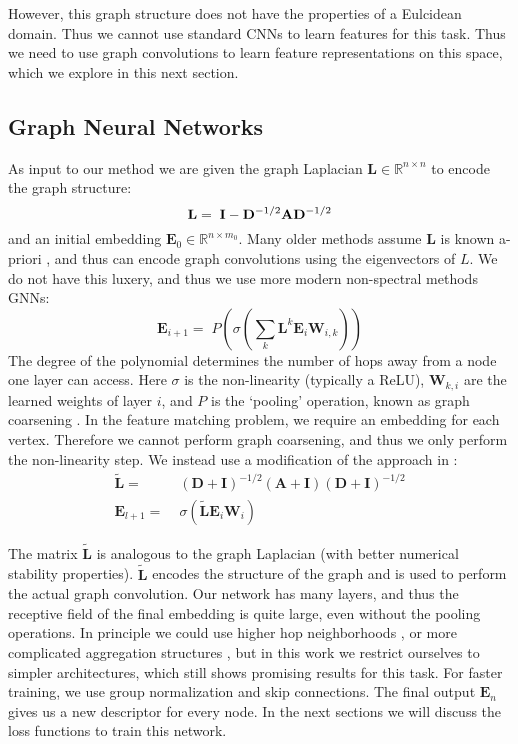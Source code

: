 \documentclass[10pt,twocolumn,letterpaper]{article}
\newcommand{\bR}{\mathbb{R}}
\newcommand{\mat}[1]{\mathbf{#1}}
\begin{document}
However, this graph structure does not have the properties of a Eulcidean domain.
Thus we cannot use standard CNNs to learn features for this task.
Thus we need to use graph convolutions to learn feature representations on this space, which we explore in this next section.

\subsection{Graph Neural Networks}
As input to our method we are given the graph Laplacian $\mat{L} \in \bR^{n \times n}$ to encode the graph structure:
\begin{equation}
  \mat{L} =\; \mat{I} - \mat{D}^{-1/2} \mat{A} \mat{D}^{-1/2} \\
\end{equation}
and an initial embedding $\mat{E}_0 \in \bR^{n \times m_0}$.
Many older methods assume $\mat{L}$ is known a-priori \cite{bruna2013spectral}, and thus can encode graph convolutions using the eigenvectors of $L$.
We do not have this luxery, and thus we use more modern non-spectral methods GNNs:
\begin{equation}
\mat{E}_{i+1} =\; P\left(\sigma\left( \sum_k \mat{L}^k \mat{E}_i \mat{W}_{i,k} \right)\right)
\end{equation}
The degree of the polynomial determines the number of hops away from a node one layer can access.
Here $\sigma$ is the non-linearity (typically a ReLU), $\mat{W}_{k,i}$ are the learned weights of layer $i$,  and $P$ is the `pooling' operation, known as graph coarsening \cite{bronstein2017geometric, gama2018mimo}.
In the feature matching problem, we require an embedding for each vertex.
Therefore we cannot perform graph coarsening, and thus we only perform the non-linearity step.
We instead use a modification of the approach in \cite{kipf2016semi}:
\begin{align}
      \widetilde{\mat{L}} =&\; (\mat{D} + \mat{I})^{-1/2} (\mat{A} + \mat{I}) (\mat{D} + \mat{I})^{-1/2} \\
\mat{E}_{l+1} =&\; \sigma\left(\widetilde{\mat{L}} \mat{E}_i \mat{W}_i \right)  \label{eq:graph_conv}
\end{align}

The matrix $\widetilde{\mat{L}}$ is analogous to the graph Laplacian (with better numerical stability properties).
$\widetilde{\mat{L}}$ encodes the structure of the graph and is used to perform the actual graph convolution.
Our network has many layers, and thus the receptive field of the final embedding is quite large, even without the pooling operations.
In principle we could use higher hop neighborhoods \cite{gama2018convolutional}, or more complicated aggregation structures \cite{battaglia2018relational}, but in this work we restrict ourselves to simpler architectures, which still shows promising results for this task.
For faster training, we use group normalization \cite{wu2018group} and skip connections.
The final output $\mat{E}_n$ gives us a new descriptor for every node.
In the next sections we will discuss the loss functions to train this network.
\end{document}

